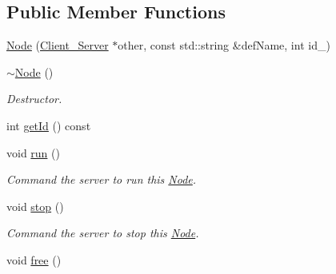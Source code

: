 \subsection*{Public Member Functions}
\begin{DoxyCompactItemize}
\item 
\hyperlink{classColliderPlusPlus_1_1Node_a19e91e34364eaec92fa843b88c9fa380}{Node} (\hyperlink{classColliderPlusPlus_1_1Client__Server}{Client\-\_\-\-Server} $\ast$other, const std\-::string \&def\-Name, int id\-\_\-)
\item 
\hypertarget{classColliderPlusPlus_1_1Node_ae1198291ae5d81dd34474b7cf52438cd}{\hyperlink{classColliderPlusPlus_1_1Node_ae1198291ae5d81dd34474b7cf52438cd}{$\sim$\-Node} ()}\label{classColliderPlusPlus_1_1Node_ae1198291ae5d81dd34474b7cf52438cd}

\begin{DoxyCompactList}\small\item\em Destructor. \end{DoxyCompactList}\item 
int \hyperlink{classColliderPlusPlus_1_1Node_a8fe1785ce07ad46c422c7451f21a30fb}{get\-Id} () const 
\item 
\hypertarget{classColliderPlusPlus_1_1Node_aab0fa08436f6493b166067a7e761c36a}{void \hyperlink{classColliderPlusPlus_1_1Node_aab0fa08436f6493b166067a7e761c36a}{run} ()}\label{classColliderPlusPlus_1_1Node_aab0fa08436f6493b166067a7e761c36a}

\begin{DoxyCompactList}\small\item\em Command the server to run this \hyperlink{classColliderPlusPlus_1_1Node}{Node}. \end{DoxyCompactList}\item 
\hypertarget{classColliderPlusPlus_1_1Node_a44da500743469ad8a4729967d1d8e2b4}{void \hyperlink{classColliderPlusPlus_1_1Node_a44da500743469ad8a4729967d1d8e2b4}{stop} ()}\label{classColliderPlusPlus_1_1Node_a44da500743469ad8a4729967d1d8e2b4}

\begin{DoxyCompactList}\small\item\em Command the server to stop this \hyperlink{classColliderPlusPlus_1_1Node}{Node}. \end{DoxyCompactList}\item 
\hypertarget{classColliderPlusPlus_1_1Node_a858d838d243f84bbb56287a7d03bb893}{void \hyperlink{classColliderPlusPlus_1_1Node_a858d838d243f84bbb56287a7d03bb893}{free} ()}\label{classColliderPlusPlus_1_1Node_a858d838d243f84bbb56287a7d03bb893}


\end{DoxyCompactItemize}
